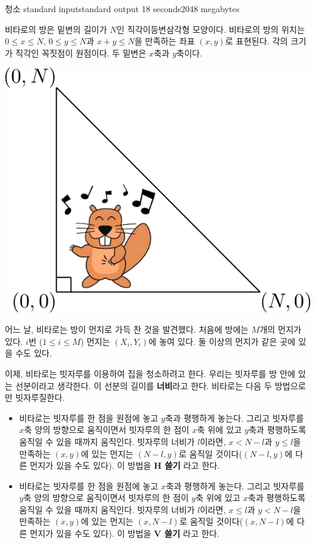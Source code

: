 \begin{problem}{청소}
	{standard input}{standard output}
	{18 seconds}{2048 megabytes}{}
	
	비타로의 방은 밑변의 길이가 $N$인 직각이등변삼각형 모양이다. 비타로의 방의 위치는 $0 \le x \le N$, $0 \le y \le N$과 $x+y \le N$을 만족하는 좌표 $(x, y)$로 표현된다. 각의 크기가 직각인 꼭짓점이 원점이다. 두 밑변은 $x$축과 $y$축이다.
	
	\begin{center}
		\includegraphics[width=0.5\linewidth]{img1.png}
	\end{center}
	
	
	
	어느 날, 비타로는 방이 먼지로 가득 찬 것을 발견했다. 처음에 방에는 $M$개의 먼지가 있다. $i$번 ($1 \le i \le M$) 먼지는 $(X_i, Y_i)$에 놓여 있다. 둘 이상의 먼지가 같은 곳에 있을 수도 있다.
	
	이제, 비타로는 빗자루를 이용하여 집을 청소하려고 한다. 우리는 빗자루를 방 안에 있는 선분이라고 생각한다. 이 선분의 길이를 \textbf{너비}라고 한다. 비타로는 다음 두 방법으로만 빗자루질한다.
	
	
	\begin{itemize}
		\item 비타로는 빗자루를 한 점을 원점에 놓고 $y$축과 평행하게 놓는다. 그리고 빗자루를 $x$축 양의 방향으로 움직이면서 빗자루의 한 점이 $x$축 위에 있고 $y$축과 평행하도록 움직일 수 있을 때까지 움직인다. 빗자루의 너비가 $l$이라면, $x<N-l$과 $y \le l$을 만족하는 $(x, y)$에 있는 먼지는 $(N-l, y)$로 움직일 것이다($(N-l, y)$에 다른 먼지가 있을 수도 있다). 이 방법을 \textbf{H 쓸기} 라고 한다.
		
		\item 비타로는 빗자루를 한 점을 원점에 놓고 $x$축과 평행하게 놓는다. 그리고 빗자루를 $y$축 양의 방향으로 움직이면서 빗자루의 한 점이 $y$축 위에 있고 $x$축과 평행하도록 움직일 수 있을 때까지 움직인다. 빗자루의 너비가 $l$이라면, $x\le l$과 $y < N-l$을 만족하는 $(x, y)$에 있는 먼지는 $(x, N-l)$로 움직일 것이다($(x, N-l)$에 다른 먼지가 있을 수도 있다). 이 방법을 \textbf{V 쓸기} 라고 한다.
	\end{itemize}
	

\end{problem}
